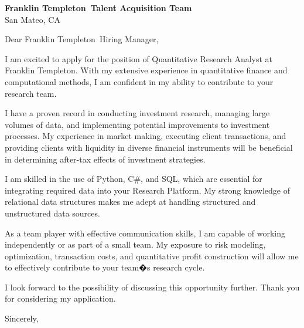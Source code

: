\documentclass{letter}
\newcommand{\company}{Franklin Templeton}
\begin{document}
\begin{letter}{\textbf{\company\ Talent Acquisition Team} \\                
    San Mateo, CA }

\opening{Dear \company\ Hiring Manager,}

I am excited to apply for the position of Quantitative Research Analyst at Franklin Templeton. With my extensive experience in quantitative finance and computational methods, I am confident in my ability to contribute to your research team.

I have a proven record in conducting investment research, managing large volumes of data, and implementing potential improvements to investment processes. My experience in market making, executing client transactions, and providing clients with liquidity in diverse financial instruments will be beneficial in determining after-tax effects of investment strategies.

I am skilled in the use of Python, C\#, and SQL, which are essential for integrating required data into your Research Platform. My strong knowledge of relational data structures makes me adept at handling structured and unstructured data sources. 

As a team player with effective communication skills, I am capable of working independently or as part of a small team. My exposure to risk modeling, optimization, transaction costs, and quantitative profit construction will allow me to effectively contribute to your team�s research cycle.

I look forward to the possibility of discussing this opportunity further. Thank you for considering my application.



\closing{Sincerely,}

\end{letter}
\end{document}
